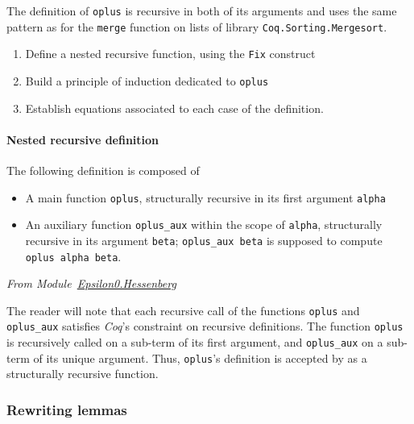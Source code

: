     The definition of \texttt{oplus} is recursive in both of its 
    arguments and uses  the same pattern as for the \texttt{merge} function on lists of library
    \texttt{Coq.Sorting.Mergesort}.

    \begin{enumerate}
    \item Define a nested recursive function, using the \texttt{Fix} 
        construct

    \item Build a principle of induction dedicated to \texttt{oplus}

    \item Establish equations associated to each case of the definition.
    \end{enumerate}

    \paragraph{Nested recursive definition}
    \label{sec:orgheadline83}

    The following definition is composed of 
    \begin{itemize}
    \item A main function \texttt{oplus}, structurally recursive in its 
    first argument \texttt{alpha}
    \item An auxiliary function \texttt{oplus\_aux} within the scope of \texttt{alpha},
    structurally recursive in its argument \texttt{beta};  \texttt{oplus\_aux beta} 
       is supposed to compute  \texttt{oplus alpha beta}.
    \end{itemize}
      
  \pagebreak 
  \vspace{4pt}
    \emph{From Module~\href{../theories/html/hydras.Epsilon0.Hessenberg.html\#oplus}{Epsilon0.Hessenberg}}

    \label{sect:infix-oplus}

    
    
 
    The reader will note that each recursive call of the functions
    \texttt{oplus} and \texttt{oplus\_aux} satisfies \emph{Coq}'s constraint
    on recursive definitions. The function \texttt{oplus} is recursively called on a sub-term of its first argument,
    and \texttt{oplus\_aux} on a sub-term of its unique argument.
    Thus, \texttt{oplus}'s definition is accepted by \coq{} as a structurally recursive function.

    \subsubsection{Rewriting lemmas}
    \label{sec:orgheadline86}

